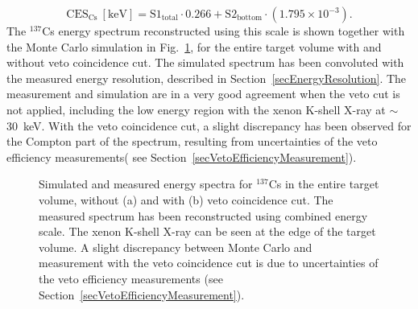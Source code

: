 \begin{equation}
\label{eqCES_Cs}
\mathrm{CES_{Cs}\ [keV]} = \mathrm{S1}_{\mathrm{total}} \cdot 0.266 + \mathrm{S2}_{\mathrm{bottom}} \cdot (1.795\times10^{-3}).
\end{equation}
The $^{137}$Cs energy spectrum reconstructed using this scale is shown together with the Monte Carlo simulation in Fig.~\ref{figCES_Cs137}, for the entire target volume with and without veto coincidence cut. The simulated spectrum has been convoluted with the measured energy resolution, described in Section~\ref{secEnergyResolution}. The measurement and simulation are in a very good agreement when the veto cut is not applied, including the low energy region with the xenon K-shell X-ray at $\sim$30~keV. With the veto coincidence cut, a slight discrepancy has been observed for the Compton part of the spectrum, resulting from uncertainties of the veto efficiency measurements( see Section~\ref{secVetoEfficiencyMeasurement}).

\begin{figure}[!h]
\centering
{}
\caption[Simulated and measured energy spectra for $^{137}$Cs in the entire target volume, without and with veto coincidence cut]{Simulated and measured energy spectra for $^{137}$Cs in the entire target volume, without (a) and with (b) veto coincidence cut. The measured spectrum has been reconstructed using combined energy scale. The xenon K-shell X-ray can be seen at the edge of the target volume. A slight discrepancy between Monte Carlo and measurement with the veto coincidence cut is due to uncertainties of the veto efficiency measurements (see Section~\ref{secVetoEfficiencyMeasurement}).}
\label{figCES_Cs137}
\end{figure}

